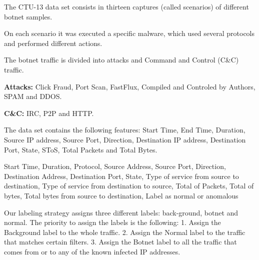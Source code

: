 \documentclass[review]{elsarticle}
\begin{document}
The CTU-13 data set consists in thirteen captures (called scenarios) of different botnet samples. 

On each scenario it was executed a specific malware, which used several protocols and performed different actions.		

The botnet traffic is divided into attacks and Command and Control (C\&C) traffic.

\textbf{Attacks:} Click Fraud, Port Scan, FastFlux, Compiled and Controled by Authors, SPAM and DDOS.

\textbf{C\&C:} IRC, P2P and HTTP.

The data set contains the following features:  Start Time, End Time, Duration, Source IP address, Source Port, Direction, Destination IP address, Destination Port, State, SToS, Total Packets and Total Bytes.

Start Time, Duration, Protocol, Source Address, Source Port, Direction, Destination Address, Destination Port, State, Type of service from source to destination, Type of service from destination to source, Total of Packets, Total of bytes, Total bytes from source to destination, Label as normal or anomalous

Our labeling strategy assigns three different labels: back-ground, botnet and normal. The priority to assign the labels is the following: 1. Assign the Background label to the whole traffic. 2. Assign the Normal label to the traffic that matches certain filters. 3. Assign the Botnet label to all the traffic that comes from or to any of the known infected IP addresses.
\end{document}
